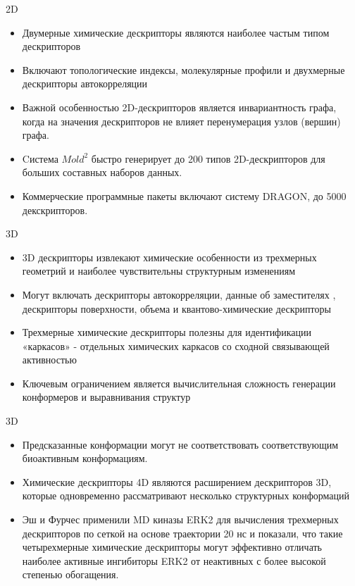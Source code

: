 \begin{frame}{2D}
    \begin{itemize}
        \item Двумерные химические дескрипторы являются наиболее частым типом дескрипторов
        \item Включают топологические индексы, молекулярные профили и двухмерные дескрипторы автокорреляции 
        \item Важной особенностью 2D-дескрипторов  является инвариантность графа, когда на значения дескрипторов не влияет перенумерация узлов (вершин) графа. 
        \item Cистема $Mold^2$ быстро генерирует до 200 типов 2D-дескрипторов для больших составных наборов данных. 
        \item Коммерческие программные пакеты  включают систему DRAGON, до 5000 декскрипторов. 
    \end{itemize}
\end{frame}

\begin{frame}{3D}
    \begin{itemize}
        \item 3D дескрипторы извлекают химические особенности из трехмерных геометрий  и наиболее чувствительны структурным изменениям 
        \item Могут  включать дескрипторы автокорреляции, данные об  заместителях , дескрипторы поверхности, объема и квантово-химические дескрипторы
        \item Трехмерные химические дескрипторы полезны для идентификации «каркасов» - отдельных химических каркасов со сходной связывающей активностью
        \item Ключевым ограничением является вычислительная сложность генерации конформеров и выравнивания структур
     \end{itemize}
\end{frame}
\begin{frame}{3D}
    \begin{itemize}
        \item Предсказанные конформации могут не соответствовать соответствующим биоактивным конформациям.
        \item Химические дескрипторы 4D являются расширением  дескрипторов 3D, которые одновременно рассматривают несколько структурных конформаций 
        \item  Эш и Фурчес применили MD киназы ERK2 для вычисления трехмерных дескрипторов по сеткой на основе траектории 20 нс и показали, что такие четырехмерные химические дескрипторы могут эффективно отличать наиболее активные ингибиторы ERK2 от неактивных с более высокой степенью обогащения. 
     \end{itemize}
\end{frame}

